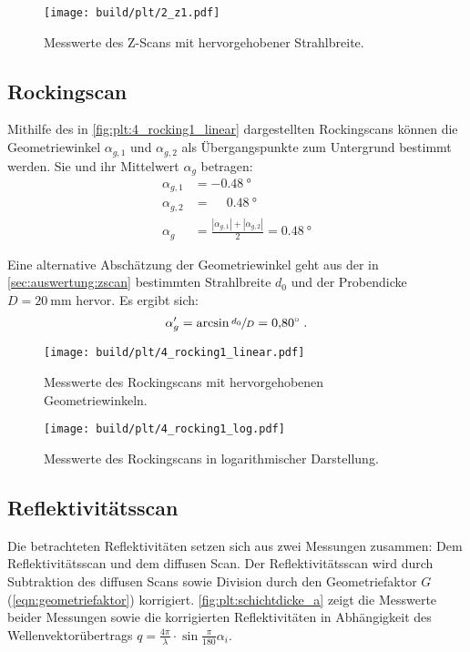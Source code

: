 \begin{figure}
    \centering
    \texttt{[image: build/plt/2\_z1.pdf]}
    \caption{Messwerte des Z-Scans mit hervorgehobener Strahlbreite.}
    \label{fig:plt:2_z1}
\end{figure}


\FloatBarrier
\subsection{Rockingscan}
Mithilfe des in \autoref{fig:plt:4_rocking1_linear} dargestellten Rockingscans
können die Geometriewinkel $\alpha_{g, 1}$ und $\alpha_{g, 2}$
als Übergangspunkte zum Untergrund bestimmt werden.
Sie und ihr Mittelwert $\alpha_g$ betragen:
\begin{align*}
    \alpha_{g, 1} &= \SI{-0.48}{\degree} \\
    \alpha_{g, 2} &= \phantom{-} \SI{0.48}{\degree} \\
    \alpha_g &= \frac{|\alpha_{g, 1}| + |\alpha_{g, 2}|}{2}
        = \SI{0.48}{\degree}
\end{align*}

Eine alternative Abschätzung der Geometriewinkel
geht aus der in \autoref{sec:auswertung:zscan} bestimmten Strahlbreite $d_0$ und der Probendicke $D = \SI{20}{\milli\meter}$ hervor.
Es ergibt sich:
\[
    \alpha_g' = \arcsin{\sfrac{d_0}{D}}
    = \SI{0.80}{\degree} \; .
\]

\begin{figure}
    \centering
    \texttt{[image: build/plt/4\_rocking1\_linear.pdf]}
    \caption{Messwerte des Rockingscans mit hervorgehobenen Geometriewinkeln.}
    \label{fig:plt:4_rocking1_linear}
\end{figure}

\begin{figure}
    \centering
    \texttt{[image: build/plt/4\_rocking1\_log.pdf]}
    \caption{Messwerte des Rockingscans in logarithmischer Darstellung.}
    \label{fig:plt:4_rocking1_log}
\end{figure}


\FloatBarrier
\subsection{Reflektivitätsscan}
Die betrachteten Reflektivitäten setzen sich aus zwei Messungen zusammen:
Dem Reflektivitätsscan und dem diffusen Scan.
Der Reflektivitätsscan wird durch
    Subtraktion des diffusen Scans sowie
    Division durch den Geometriefaktor $G$ (\autoref{eqn:geometriefaktor})
korrigiert.
\autoref{fig:plt:schichtdicke_a} zeigt die Messwerte beider Messungen sowie die korrigierten Reflektivitäten
in Abhängigkeit des Wellenvektorübertrags $q = \frac{4\pi}{\lambda} · \sin{\frac{\pi}{180} \alpha_i}$.

